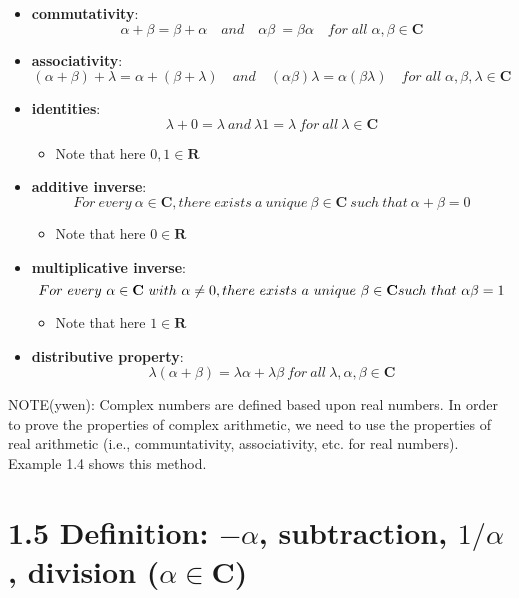 \documentclass[12pt, letterpaper, oneside]{book}
\begin{document}
\begin{itemize}
  \item \textbf{commutativity}:
    \[
      \alpha + \beta = \beta + \alpha \quad and \quad \alpha\beta\ =
      \beta\alpha \quad for \; all \; \alpha, \beta \in \mathbf{C}
    \]
  \item \textbf{associativity}:
    \[
      (\alpha + \beta) + \lambda = \alpha + (\beta + \lambda) \quad and \quad
      (\alpha\beta)\lambda = \alpha(\beta\lambda) \quad for \; all \; \alpha,
      \beta, \lambda \in \mathbf{C}
    \]
  \item \textbf{identities}:
    \[
      \lambda + 0 = \lambda \ and \ \lambda1 = \lambda \ for \ all \ \lambda
      \in \mathbf{C}
    \]
    \begin{itemize}
      \item Note that here $0, 1 \in \mathbf{R}$
    \end{itemize}
  \item \textbf{additive inverse}:
    \[
      For \ every \ \alpha \in \mathbf{C}, there \ exists \ a \ unique \ \beta
      \in \mathbf{C} \ such \ that \ \alpha + \beta = 0
    \]
    \begin{itemize}
      \item Note that here $0 \in \mathbf{R}$
    \end{itemize}
  \item \textbf{multiplicative inverse}:
    \[
      For \ every \ \alpha \in \mathbf{C} \ with \ \alpha \neq 0, there \
      exists \ a \ unique \ \beta \in \mathbf{C} \newline such \ that \
      \alpha\beta = 1
    \]
    \begin{itemize}
      \item Note that here $1 \in \mathbf{R}$
    \end{itemize}
  \item \textbf{distributive property}:
    \[
      \lambda(\alpha + \beta) = \lambda\alpha + \lambda\beta \ for \ all \
      \lambda, \alpha, \beta \in \mathbf{C}
    \]
\end{itemize}

NOTE(ywen): Complex numbers are defined based upon real numbers. In order to
prove the properties of complex arithmetic, we need to use the properties of
real arithmetic (i.e., communtativity, associativity, etc. for real numbers).
Example 1.4 shows this method.

\section{
  1.5 Definition: $-\alpha$, subtraction, $1/\alpha$, division
  ($\alpha \in \mathbf{C}$)
}
\end{document}
